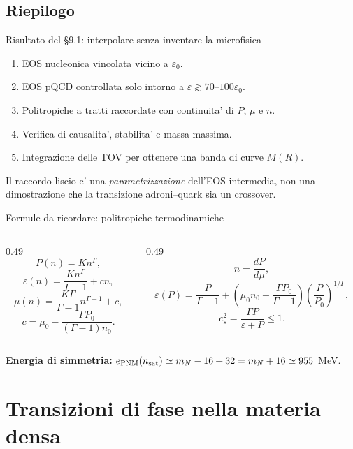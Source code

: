 \subsection{Riepilogo}

\begin{frame}{Risultato del \S9.1: interpolare senza inventare la microfisica}
\small
\begin{enumerate}
\item EOS nucleonica vincolata vicino a $\varepsilon_0$.
\item EOS pQCD controllata solo intorno a $\varepsilon\gtrsim70\text{--}100\varepsilon_0$.
\item Politropiche a tratti raccordate con continuita' di $P$, $\mu$ e $n$.
\item Verifica di causalita', stabilita' e massa massima.
\item Integrazione delle TOV per ottenere una banda di curve $M(R)$.
\end{enumerate}
\medskip
Il raccordo liscio e' una \emph{parametrizzazione} dell'EOS intermedia, non una dimostrazione che la transizione adroni--quark sia un crossover.
\end{frame}

\begin{frame}{Formule da ricordare: politropiche termodinamiche}
\footnotesize
\begin{columns}[T,onlytextwidth]
\begin{column}{0.49\textwidth}
\[
P(n)=Kn^\Gamma,
\]
\[
\varepsilon(n)=\frac{Kn^\Gamma}{\Gamma-1}+cn,
\]
\[
\mu(n)=\frac{K\Gamma}{\Gamma-1}n^{\Gamma-1}+c,
\]
\[
c=\mu_0-\frac{\Gamma P_0}{(\Gamma-1)n_0}.
\]
\end{column}
\begin{column}{0.49\textwidth}
\[
n=\frac{dP}{d\mu},
\]
\[
\varepsilon(P)=\frac{P}{\Gamma-1}
+\left(\mu_0n_0-\frac{\Gamma P_0}{\Gamma-1}\right)
\left(\frac{P}{P_0}\right)^{1/\Gamma},
\]
\[
c_s^2=\frac{\Gamma P}{\varepsilon+P}\leq1.
\]
\end{column}
\end{columns}
\medskip
\textbf{Energia di simmetria:} $e_{\rm PNM}(n_{\rm sat})\simeq m_N-16+32=m_N+16\simeq955$ MeV.
\end{frame}

\section{Transizioni di fase nella materia densa}

